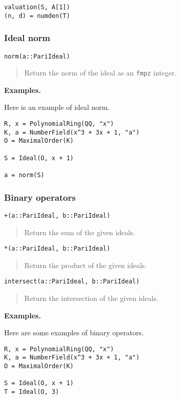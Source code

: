 \documentclass[a4paper,10pt]{article}
\newcommand{\code}{\lstinline}
\newcommand{\desc}[1]{\vspace{-3mm}\begin{quote}#1\end{quote}}
\begin{document}
{{\begin{lstlisting}
valuation(S, A[1])
(n, d) = numden(T)
\end{lstlisting}

\subsubsection{Ideal norm}

\begin{lstlisting}
norm(a::PariIdeal)
\end{lstlisting}

\desc{Return the norm of the ideal as an \code{fmpz} integer.}

\textbf{Examples.}

Here is an example of ideal norm.

\begin{lstlisting}
R, x = PolynomialRing(QQ, "x")
K, a = NumberField(x^3 + 3x + 1, "a")
O = MaximalOrder(K)

S = Ideal(O, x + 1)

a = norm(S)
\end{lstlisting}

\subsubsection{Binary operators}

\begin{lstlisting}
+(a::PariIdeal, b::PariIdeal)
\end{lstlisting}

\desc{Return the sum of the given ideals.}

\begin{lstlisting}
*(a::PariIdeal, b::PariIdeal)
\end{lstlisting}

\desc{Return the product of the given ideals.}

\begin{lstlisting}
intersect(a::PariIdeal, b::PariIdeal)
\end{lstlisting}

\desc{Return the intersection of the given ideals.}

\textbf{Examples.}

Here are some examples of binary operators.

\begin{lstlisting}
R, x = PolynomialRing(QQ, "x")
K, a = NumberField(x^3 + 3x + 1, "a")
O = MaximalOrder(K)

S = Ideal(O, x + 1)
T = Ideal(O, 3)


\end{lstlisting}}}
\end{document}
